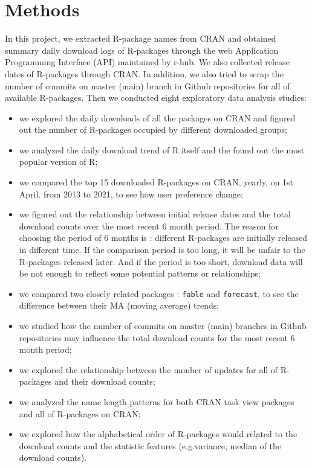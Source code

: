 \documentclass[
]{book}
\begin{document}
\hypertarget{methods}{%
\chapter{Methods}\label{methods}}

In this project, we extracted R-package names from CRAN and obtained summary daily download logs of R-packages through the web Application Programming Interface (API) maintained by r-hub\citep{rhub}. We also collected release dates of R-packages through CRAN. In addition, we also tried to scrap the number of commits on master (main) branch in Github repositories for all of available R-packages. Then we conducted eight exploratory data analysis studies:

\begin{itemize}
\item
  we explored the daily downloads of all the packages on CRAN and figured out the number of R-packages occupied by different downloaded groups;
\item
  we analyzed the daily download trend of R itself and the found out the most popular version of R;
\item
  we compared the top 15 downloaded R-packages on CRAN, yearly, on 1st April. from 2013 to 2021, to see how user preference change;
\item
  we figured out the relationship between initial release dates and the total download counts over the most recent 6 month period. The reason for choosing the period of 6 months is : different R-packages are initially released in different time. If the comparison period is too long, it will be unfair to the R-packages released later. And if the period is too short, download data will be not enough to reflect some potential patterns or relationships;
\item
  we compared two closely related packages : \texttt{fable} and \texttt{forecast}, to see the difference between their MA (moving average) trends;
\item
  we studied how the number of commits on master (main) branches in Github repositories may influence the total download counts for the most recent 6 month period;
\item
  we explored the relationship between the number of updates for all of R-packages and their download counts;
\item
  we analyzed the name length patterns for both CRAN task view packages and all of R-packages on CRAN;
\item
  we explored how the alphabetical order of R-packages would related to the download counts and the statistic features (e.g.variance, median of the download counts).
\end{itemize}
\end{document}

